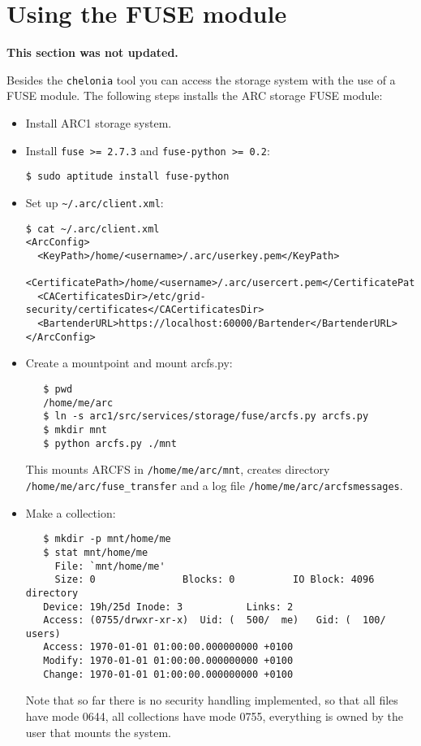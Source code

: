 \documentclass{article}
\begin{document}
\section{Using the FUSE module} %
\label{sec:using_the_fuse_module}

\textbf{This section was not updated.}

Besides the \verb!chelonia! tool you can access the storage system with the use of a FUSE module. The following steps installs the ARC storage FUSE module:

\begin{itemize}
\item Install ARC1 storage system.

\item Install \verb!fuse >= 2.7.3! and \verb!fuse-python >= 0.2!:
\begin{verbatim}
$ sudo aptitude install fuse-python
\end{verbatim}

\item Set up \verb!~/.arc/client.xml!:

\begin{verbatim}
$ cat ~/.arc/client.xml 
<ArcConfig>
  <KeyPath>/home/<username>/.arc/userkey.pem</KeyPath>
  <CertificatePath>/home/<username>/.arc/usercert.pem</CertificatePath>
  <CACertificatesDir>/etc/grid-security/certificates</CACertificatesDir>
  <BartenderURL>https://localhost:60000/Bartender</BartenderURL>
</ArcConfig>
\end{verbatim}

\item Create a mountpoint and mount arcfs.py:
\begin{verbatim}
   $ pwd
   /home/me/arc
   $ ln -s arc1/src/services/storage/fuse/arcfs.py arcfs.py
   $ mkdir mnt
   $ python arcfs.py ./mnt 
\end{verbatim}
This mounts ARCFS in \verb!/home/me/arc/mnt!, creates directory
\verb!/home/me/arc/fuse_transfer! and a log file
\verb!/home/me/arc/arcfsmessages!.

\item Make a collection:
\begin{verbatim}   
   $ mkdir -p mnt/home/me
   $ stat mnt/home/me
     File: `mnt/home/me'
     Size: 0               Blocks: 0          IO Block: 4096   directory
   Device: 19h/25d Inode: 3           Links: 2
   Access: (0755/drwxr-xr-x)  Uid: (  500/  me)   Gid: (  100/   users)
   Access: 1970-01-01 01:00:00.000000000 +0100
   Modify: 1970-01-01 01:00:00.000000000 +0100
   Change: 1970-01-01 01:00:00.000000000 +0100
\end{verbatim}
Note that so far there is no security handling implemented, so
that all files have mode 0644, all collections have mode 0755,
everything is owned by the user that mounts the system.


\end{itemize}
\end{document}
